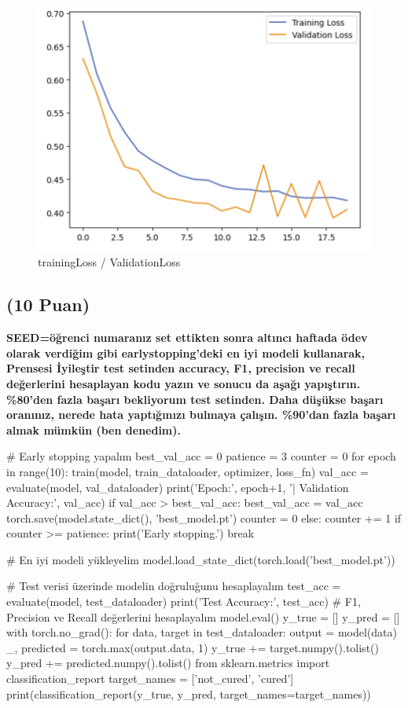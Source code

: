 \documentclass[11pt]{article}
\begin{document}
\begin{figure}[ht!]
    \centering
\includegraphics{picture1.png}
    \caption{trainingLoss / ValidationLoss}
    \label{fig:my_pic}
\end{figure}



\subsection{(10 Puan)} \textbf{SEED=öğrenci numaranız set ettikten sonra altıncı haftada ödev olarak verdiğim gibi earlystopping'deki en iyi modeli kullanarak, Prensesi İyileştir test setinden accuracy, F1, precision ve recall değerlerini hesaplayan kodu yazın ve sonucu da aşağı yapıştırın. \%80'den fazla başarı bekliyorum test setinden. Daha düşükse başarı oranınız, nerede hata yaptığınızı bulmaya çalışın. \%90'dan fazla başarı almak mümkün (ben denedim).}

\begin{python}
# Early stopping yapalım
best_val_acc = 0
patience = 3
counter = 0
for epoch in range(10):
    train(model, train_dataloader, optimizer, loss_fn)
    val_acc = evaluate(model, val_dataloader)
    print('Epoch:', epoch+1, '| Validation Accuracy:', val_acc)
    if val_acc > best_val_acc:
        best_val_acc = val_acc
        torch.save(model.state_dict(), 'best_model.pt')
        counter = 0
    else:
        counter += 1
        if counter >= patience:
            print('Early stopping.')
            break
            
# En iyi modeli yükleyelim
model.load_state_dict(torch.load('best_model.pt'))

# Test verisi üzerinde modelin doğruluğunu hesaplayalım
test_acc = evaluate(model, test_dataloader)
print('Test Accuracy:', test_acc)
# F1, Precision ve Recall değerlerini hesaplayalım
model.eval()
y_true = []
y_pred = []
with torch.no_grad():
    for data, target in test_dataloader:
        output = model(data)
        _, predicted = torch.max(output.data, 1)
        y_true += target.numpy().tolist()
        y_pred += predicted.numpy().tolist()
from sklearn.metrics import classification_report
target_names = ['not_cured', 'cured']
print(classification_report(y_true, y_pred, target_names=target_names))
\end{python}
\end{document}

